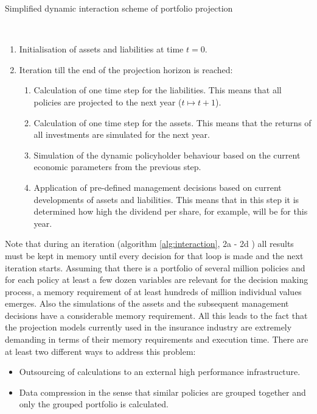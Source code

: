 \begin{algorithm}
	\caption{Simplified dynamic interaction scheme of portfolio projection}\label{alg:interaction}
	\begin{algorithmic}
		\\
		\begin{enumerate}
			\item Initialisation of assets and liabilities at time $t = 0$.
			\item  Iteration till the end of the projection horizon is reached:
			\begin{enumerate}[label=\emph{\alph*})]
				\item Calculation of one time step for the liabilities. This means that all policies are projected to the next year ($t \mapsto t+1$). 
				\item Calculation of one time step for the assets. This means that the returns of all investments are simulated for the next year.
				\item Simulation of the dynamic policyholder behaviour based on the current economic parameters from the previous step.
				\item Application of pre-defined management decisions based on current developments of assets and liabilities. This means that in this step it is determined how high the dividend per share, for example, will be for this year. 
			\end{enumerate}
		\end{enumerate}
	\end{algorithmic}
\end{algorithm}

Note that during an iteration (algorithm \ref{alg:interaction}, 2a - 2d ) all results must be kept in memory until every decision for that loop is made and the next iteration starts. Assuming that there is a portfolio of several million policies and for each policy at least a few dozen variables are relevant for the decision making process, a memory requirement of at least hundreds of million individual values emerges. Also the simulations of the assets and the subsequent management decisions have a considerable memory requirement. All this leads to the fact that the projection models currently used in the insurance industry are extremely demanding in terms of their memory requirements and execution time. There are at least two different ways to address this problem:

\begin{itemize}
	\item Outsourcing of calculations to an external high performance infrastructure.
	\item Data compression in the sense that similar policies are grouped together and only the grouped portfolio is calculated.
\end{itemize}

